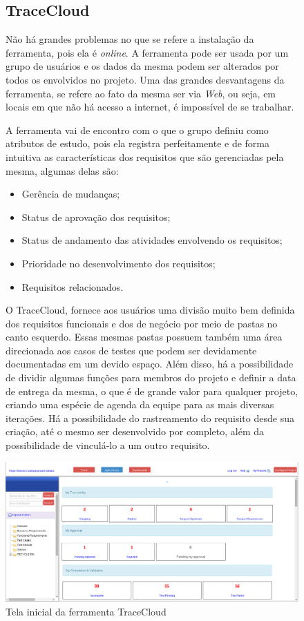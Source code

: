 \begin{figure}[!htb]
\subsection{TraceCloud}
Não há grandes problemas no que se refere a instalação da ferramenta, pois ela é \textit{online}. A ferramenta pode ser usada por um grupo de usuários e os dados da mesma podem ser alterados por todos os envolvidos no projeto. Uma das grandes desvantagens da ferramenta, se refere ao fato da mesma ser via \textit{Web}, ou seja, em locais em que não há acesso a internet, é impossível de se trabalhar.

A ferramenta vai de encontro com o que o grupo definiu como atributos de estudo, pois ela registra perfeitamente e de forma intuitiva as características dos requisitos que são gerenciadas pela mesma, algumas delas são:
\begin{itemize}
  \item Gerência de mudanças;
  \item Status de aprovação dos requisitos;
  \item Status de andamento das atividades envolvendo os requisitos;
  \item Prioridade no desenvolvimento dos requisitos;
  \item Requisitos relacionados.
\end{itemize}

O TraceCloud, fornece aos usuários uma divisão muito bem definida dos requisitos funcionais e dos de negócio por meio de pastas no canto esquerdo. Essas mesmas pastas possuem também uma área direcionada aos casos de testes que podem ser devidamente documentadas em um devido espaço.
Além disso, há a possibilidade de dividir algumas funções para membros do projeto e definir a data de entrega da mesma, o que é de grande valor para
qualquer projeto, criando uma espécie de agenda da equipe para as mais diversas iterações. Há a possibilidade do rastreamento do requisito desde sua criação,
até o mesmo ser desenvolvido por completo, além da possibilidade de vinculá-lo a um outro requisito.

\centering
\includegraphics[scale=0.3]{figuras/trace.jpg}
\caption{Tela inicial da ferramenta TraceCloud}
\label{Rotulo}
\end{figure}

